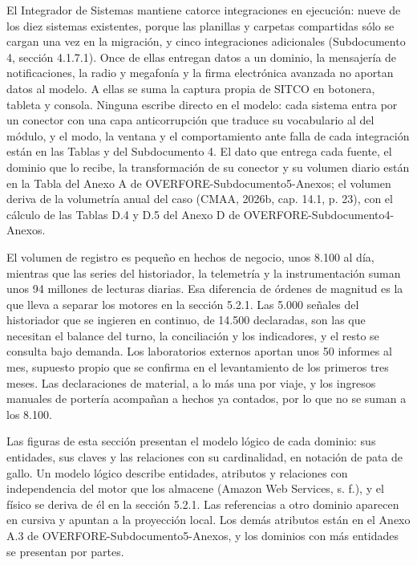 \documentclass[subdoc]{../../comun/overfore}
\begin{document}
El Integrador de Sistemas mantiene catorce integraciones en ejecución: nueve de los diez sistemas existentes, porque las planillas y carpetas compartidas sólo se cargan una vez en la migración, y cinco integraciones adicionales (Subdocumento 4, sección 4.1.7.1). Once de ellas entregan datos a un dominio, la mensajería de notificaciones, la radio y megafonía y la firma electrónica avanzada no aportan datos al modelo. A ellas se suma la captura propia de SITCO en botonera, tableta y consola. Ninguna escribe directo en el modelo: cada sistema entra por un conector con una capa anticorrupción que traduce su vocabulario al del módulo, y el modo, la ventana y el comportamiento ante falla de cada integración están en las Tablas  y  del Subdocumento 4. El dato que entrega cada fuente, el dominio que lo recibe, la transformación de su conector y su volumen diario están en la Tabla  del Anexo A de OVERFORE-Subdocumento5-Anexos; el volumen deriva de la volumetría anual del caso (CMAA, 2026b, cap. 14.1, p. 23), con el cálculo de las Tablas D.4 y D.5 del Anexo D de OVERFORE-Subdocumento4-Anexos.

El volumen de registro es pequeño en hechos de negocio, unos 8.100 al día, mientras que las series del historiador, la telemetría y la instrumentación suman unos 94 millones de lecturas diarias. Esa diferencia de órdenes de magnitud es la que lleva a separar los motores en la sección 5.2.1. Las 5.000 señales del historiador que se ingieren en continuo, de 14.500 declaradas, son las que necesitan el balance del turno, la conciliación y los indicadores, y el resto se consulta bajo demanda. Los laboratorios externos aportan unos 50 informes al mes, supuesto propio que se confirma en el levantamiento de los primeros tres meses. Las declaraciones de material, a lo más una por viaje, y los ingresos manuales de portería acompañan a hechos ya contados, por lo que no se suman a los 8.100.

Las figuras de esta sección presentan el modelo lógico de cada dominio: sus entidades, sus claves y las relaciones con su cardinalidad, en notación de pata de gallo. Un modelo lógico describe entidades, atributos y relaciones con independencia del motor que los almacene (Amazon Web Services, s. f.), y el físico se deriva de él en la sección 5.2.1. Las referencias a otro dominio aparecen en cursiva y apuntan a la proyección local. Los demás atributos están en el Anexo A.3 de OVERFORE-Subdocumento5-Anexos, y los dominios con más entidades se presentan por partes.
\end{document}
